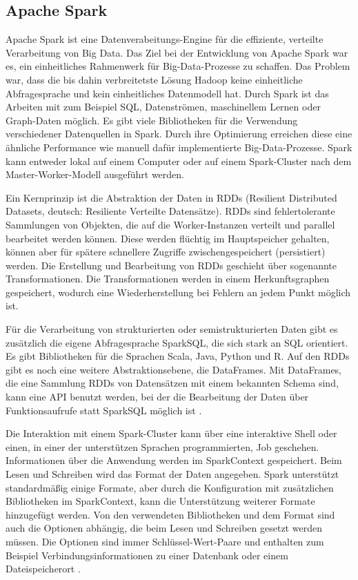 \subsection{Apache Spark}
\label{sec:spark}

Apache Spark ist eine Datenverabeitungs-Engine für die effiziente, verteilte Verarbeitung von Big Data.
Das Ziel bei der Entwicklung von Apache Spark war es, ein einheitliches Rahmenwerk für Big-Data-Prozesse zu schaffen.
Das Problem war, dass die bis dahin verbreitetste Lösung Hadoop keine einheitliche Abfragesprache und kein einheitliches Datenmodell hat.
Durch Spark ist das Arbeiten mit zum Beispiel SQL, Datenströmen, maschinellem Lernen oder Graph-Daten möglich.
Es gibt viele Bibliotheken für die Verwendung verschiedener Datenquellen in Spark.
Durch ihre Optimierung erreichen diese eine ähnliche Performance wie manuell dafür implementierte Big-Data-Prozesse.
Spark kann entweder lokal auf einem Computer oder auf einem Spark-Cluster nach dem Master-Worker-Modell ausgeführt werden.

Ein Kernprinzip ist die Abstraktion der Daten in RDDs (Resilient Distributed Datasets, deutsch: Resiliente Verteilte Datensätze).
RDDs sind fehlertolerante Sammlungen von Objekten, die auf die Worker-Instanzen verteilt und parallel bearbeitet werden können.
Diese werden flüchtig im Hauptspeicher gehalten, können aber für spätere schnellere Zugriffe zwischengespeichert (persistiert) werden.
Die Erstellung und Bearbeitung von RDDs geschieht über sogenannte Transformationen.
Die Transformationen werden in einem Herkunftsgraphen gespeichert, wodurch eine Wiederherstellung bei Fehlern an jedem Punkt möglich ist.

Für die Verarbeitung von strukturierten oder semistrukturierten Daten gibt es zusätzlich die eigene Abfragesprache SparkSQL, die sich stark an SQL orientiert.
Es gibt Bibliotheken für die Sprachen Scala, Java, Python und R.
Auf den RDDs gibt es noch eine weitere Abstraktionsebene, die DataFrames.
Mit DataFrames, die eine Sammlung RDDs von Datensätzen mit einem bekannten Schema sind, kann eine API benutzt werden, bei der die Bearbeitung der Daten über Funktionsaufrufe statt SparkSQL möglich ist \parencite{spark}.

Die Interaktion mit einem Spark-Cluster kann über eine interaktive Shell oder einen, in einer der unterstützen Sprachen programmierten, Job geschehen.
Informationen über die Anwendung werden im SparkContext gespeichert.
Beim Lesen und Schreiben wird das Format der Daten angegeben.
Spark unterstützt standardmäßig einige Formate, aber durch die Konfiguration mit zusätzlichen Bibliotheken im SparkContext, kann die Unterstützung weiterer Formate hinzugefügt werden.
Von den verwendeten Bibliotheken und dem Format sind auch die Optionen abhängig, die beim Lesen und Schreiben gesetzt werden müssen.
Die Optionen sind immer Schlüssel-Wert-Paare und enthalten zum Beispiel Verbindungsinformationen zu einer Datenbank oder einem Dateispeicherort \parencite{spark-website}.
